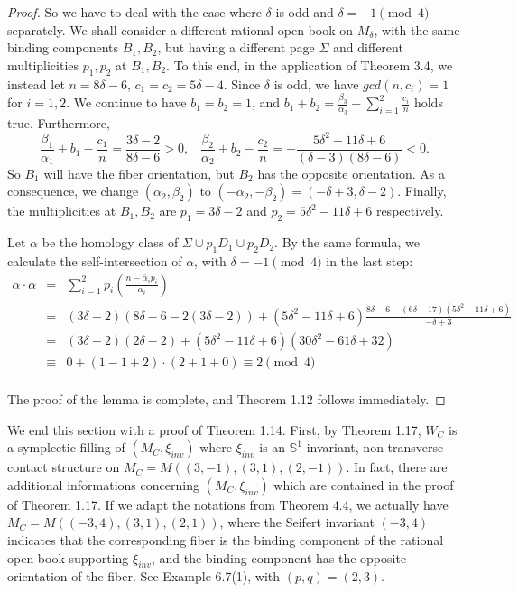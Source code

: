 \documentclass[11pt]{amsart}
\theoremstyle{plain}
\numberwithin{theorem}{section}
\theoremstyle{definition}
\newcommand{\s}{{\mathbb S}}
\begin{document}
\begin{proof}
So we have to deal with the case where $\delta$ is odd and $\delta=-1\pmod{4}$ separately. We shall
consider a different rational open book on $M_\delta$, with the same binding components
$B_1,B_2$, but having a different page $\Sigma$ and different multiplicities $p_1,p_2$
at $B_1,B_2$. To this end, in the application of Theorem 3.4, we instead let $n=8\delta-6$,
$c_1=c_2=5\delta-4$. Since $\delta$ is odd, we have $gcd(n,c_i)=1$ for $i=1,2$. We continue to
have $b_1=b_2=1$, and $b_1+b_2=\frac{\beta_3}{\alpha_3}+\sum_{i=1}^2 \frac{c_i}{n}$ holds true.
Furthermore,
$$
\frac{\beta_1}{\alpha_1}+b_1-\frac{c_1}{n}=\frac{3\delta-2}{8\delta-6}>0,\;\;\; 
\frac{\beta_2}{\alpha_2}+b_2-\frac{c_2}{n}=-\frac{5\delta^2-11\delta+6}{(\delta-3)(8\delta-6)}<0.
$$
So $B_1$ will have the fiber orientation, but $B_2$ has the opposite orientation. As a consequence,
we change $(\alpha_2,\beta_2)$ to $(-\alpha_2,-\beta_2)=(-\delta+3,\delta-2)$. Finally, the multiplicities 
at $B_1,B_2$ are $p_1=3\delta-2$ and $p_2=5\delta^2-11\delta+6$ respectively.

Let $\alpha$ be the homology class of $\Sigma\cup p_1D_1\cup p_2 D_2$. By the same formula, we calculate the self-intersection of $\alpha$, with $\delta=-1\pmod{4}$ in the last step:
\begin{eqnarray*}
\alpha\cdot\alpha &= & \sum_{i=1}^2 p_i (\frac{n-\bar{\alpha}_i p_i}{\alpha_i})\\
& = & (3\delta-2)(8\delta-6-2(3\delta-2))+(5\delta^2-11\delta+6)
\frac{8\delta-6-(6\delta-17)(5\delta^2-11\delta+6)}{-\delta+3}\\
& = & (3\delta-2)(2\delta-2)+(5\delta^2-11\delta+6)(30\delta^2-61\delta+32)\\
& \equiv & 0+ (1-1+2)\cdot (2+1+0) \equiv 2 \pmod{4}\\
\end{eqnarray*}

The proof of the lemma is complete, and Theorem 1.12 follows immediately. 

\end{proof}

We end this section with a proof of Theorem 1.14. First, by Theorem 1.17, 
$W_C$ is a symplectic filling of $(M_C,\xi_{inv})$ where $\xi_{inv}$ is an $\s^1$-invariant, non-transverse contact structure on $M_C=M((3,-1), (3,1), (2,-1))$. In fact, there are additional informations
concerning $(M_C,\xi_{inv})$ which are contained in the proof of Theorem 1.17. If we adapt the notations from Theorem 4.4, we actually have $M_C=M((-3,4), (3,1), (2,1))$, where the Seifert invariant $(-3,4)$ indicates that the corresponding fiber is the binding component of the rational open book supporting $\xi_{inv}$, and the binding component has the opposite orientation of the fiber. 
See Example 6.7(1), with $(p,q)=(2,3)$. 
\end{document}
